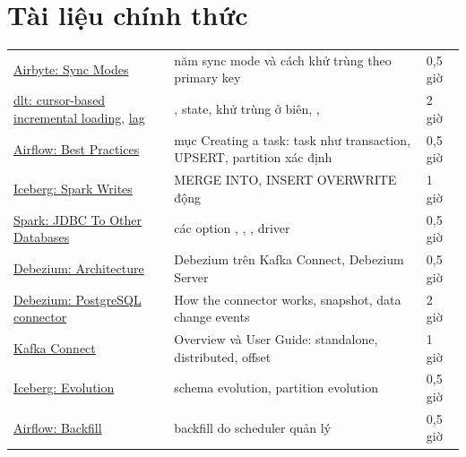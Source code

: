 \section{Tài liệu chính thức}
\begin{xltabular}{\textwidth}{@{}P{4.6cm} L P{1.8cm}@{}}
\toprule
{} &  &  \\
\midrule
\endhead
\bottomrule
\endfoot
\href{https://docs.airbyte.com/platform/using-airbyte/core-concepts/sync-modes}{Airbyte: Sync Modes} & năm sync mode và cách khử trùng theo primary key & 0,5 giờ \\
\href{https://dlthub.com/docs/general-usage/incremental/cursor}{dlt: cursor-based incremental loading}, \href{https://dlthub.com/docs/general-usage/incremental/lag}{lag} & , state, khử trùng ở biên, ,  & 2 giờ \\
\href{https://airflow.apache.org/docs/apache-airflow/stable/best-practices.html}{Airflow: Best Practices} & mục Creating a task: task như transaction, UPSERT, partition xác định & 0,5 giờ \\
\href{https://iceberg.apache.org/docs/latest/spark-writes/}{Iceberg: Spark Writes} & MERGE INTO, INSERT OVERWRITE động & 1 giờ \\
\href{https://spark.apache.org/docs/latest/sql-data-sources-jdbc.html}{Spark: JDBC To Other Databases} & các option , , , driver & 0,5 giờ \\
\href{https://debezium.io/documentation/reference/stable/architecture.html}{Debezium: Architecture} & Debezium trên Kafka Connect, Debezium Server & 0,5 giờ \\
\href{https://debezium.io/documentation/reference/stable/connectors/postgresql.html}{Debezium: PostgreSQL connector} & How the connector works, snapshot, data change events & 2 giờ \\
\href{https://kafka.apache.org/44/kafka-connect/overview/}{Kafka Connect} & Overview và User Guide: standalone, distributed, offset & 1 giờ \\
\href{https://iceberg.apache.org/docs/latest/evolution/}{Iceberg: Evolution} & schema evolution, partition evolution & 0,5 giờ \\
\href{https://airflow.apache.org/docs/apache-airflow/stable/core-concepts/backfill.html}{Airflow: Backfill} & backfill do scheduler quản lý & 0,5 giờ \\
\end{xltabular}


